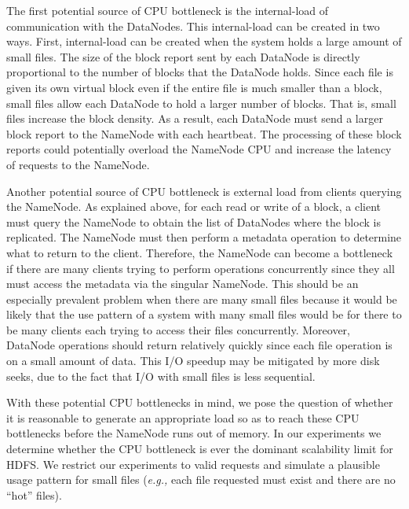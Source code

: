 \documentclass[11pt, a4paper]{article}
\begin{document}
\begin{multicols*}{2}
The first potential source of CPU bottleneck is the internal-load of communication with the DataNodes. This internal-load can be created in two ways. First, internal-load can be created when the system holds a large amount of small files. The size of the block report sent by each DataNode is directly proportional to the number of blocks that the DataNode holds. Since each file is given its own virtual block even if the entire file is much smaller than a block, small files allow each DataNode to hold a larger number of blocks. That is, small files increase the block density. As a result, each DataNode must send a larger block report to the NameNode with each heartbeat. The processing of these block reports could potentially overload the NameNode CPU and increase the latency of requests to the NameNode.

Another potential source of CPU bottleneck is external load from clients querying the NameNode. As explained above, for each read or write of a block, a client must query the NameNode to obtain the list of DataNodes where the block is replicated. The NameNode must then perform a metadata operation to determine what to return to the client. Therefore, the NameNode can become a bottleneck if there are many clients trying to perform operations concurrently since they all must access the metadata via the singular NameNode. This should be an especially prevalent problem when there are many small files because it would be likely that the use pattern of a system with many small files would be for there to be many clients each trying to access their files concurrently. Moreover, DataNode operations should return relatively quickly since each file operation is on a small amount of data. This I/O speedup may be mitigated by more disk seeks, due to the fact that I/O with small files is less sequential.

With these potential CPU bottlenecks in mind, we pose the question of whether it is reasonable to generate an appropriate load so as to reach these CPU bottlenecks before the NameNode runs out of memory. In our experiments we determine whether the CPU bottleneck is ever the dominant scalability limit for HDFS. We restrict our experiments to valid requests and simulate a plausible usage pattern for small files (\textit{e.g.,} each file requested must exist and there are no ``hot'' files).


\end{multicols*}
\end{document}
